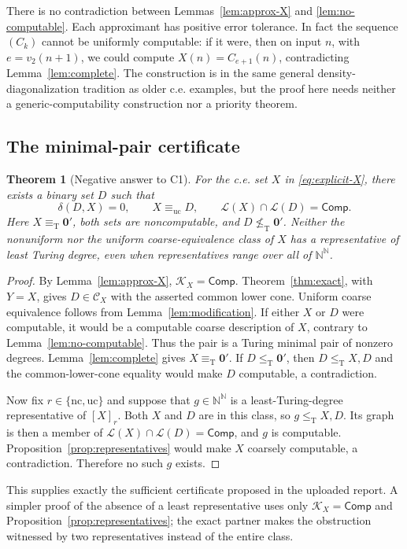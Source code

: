 \documentclass[11pt,a4paper]{article}
\newcommand{\N}{\mathbb N}
\newcommand{\Baire}{\N^{\N}}
\newcommand{\leT}{\leq_{\mathrm T}}
\newcommand{\nleT}{\nleq_{\mathrm T}}
\newcommand{\eqT}{\equiv_{\mathrm T}}
\newcommand{\nc}{\mathrm{nc}}
\newcommand{\uc}{\mathrm{uc}}
\newcommand{\CD}[1]{\mathcal C_{#1}}
\newcommand{\Core}[1]{\mathcal K_{#1}}
\newcommand{\Low}[1]{\mathcal L(#1)}
\newcommand{\Comp}{\mathsf{Comp}}
\newtheorem{theorem}{Theorem}[section]
\theoremstyle{definition}\newtheorem{definition}[theorem]{Definition}
\theoremstyle{remark}\newtheorem{remark}[theorem]{Remark}
\begin{document}
There is no contradiction between Lemmas~\ref{lem:approx-X} and \ref{lem:no-computable}. Each approximant has positive error tolerance. In fact the sequence $(C_k)$ cannot be uniformly computable: if it were, then on input $n$, with $e=v_2(n+1)$, we could compute $X(n)=C_{e+1}(n)$, contradicting Lemma~\ref{lem:complete}. The construction is in the same general density-diagonalization tradition as older c.e. examples, but the proof here needs neither a generic-computability construction nor a priority theorem.\cite{JS}

\subsection{The minimal-pair certificate}
\begin{theorem}[Negative answer to C1]\label{thm:C1}
For the c.e. set $X$ in \eqref{eq:explicit-X}, there exists a binary set $D$ such that
\[
 \delta(D,X)=0,\qquad X\equiv_{\uc}D,
 \qquad \Low X\cap\Low D=\Comp.
\]
Here $X\eqT\mathbf0'$, both sets are noncomputable, and $D\nleT\mathbf0'$. Neither the nonuniform nor the uniform coarse-equivalence class of $X$ has a representative of least Turing degree, even when representatives range over all of $\Baire$.
\end{theorem}
\begin{proof}
By Lemma~\ref{lem:approx-X}, $\Core X=\Comp$. Theorem~\ref{thm:exact}, with $Y=X$, gives $D\in\CD X$ with the asserted common lower cone. Uniform coarse equivalence follows from Lemma~\ref{lem:modification}. If either $X$ or $D$ were computable, it would be a computable coarse description of $X$, contrary to Lemma~\ref{lem:no-computable}. Thus the pair is a Turing minimal pair of nonzero degrees. Lemma~\ref{lem:complete} gives $X\eqT\mathbf0'$. If $D\leT\mathbf0'$, then $D\leT X,D$ and the common-lower-cone equality would make $D$ computable, a contradiction.

Now fix $r\in\{\nc,\uc\}$ and suppose that $g\in\Baire$ is a least-Turing-degree representative of $[X]_r$. Both $X$ and $D$ are in this class, so $g\leT X,D$. Its graph is then a member of $\Low X\cap\Low D=\Comp$, and $g$ is computable. Proposition~\ref{prop:representatives} would make $X$ coarsely computable, a contradiction. Therefore no such $g$ exists.
\end{proof}

This supplies exactly the sufficient certificate proposed in the uploaded report.\cite[Proposition ``A sufficient certificate for no least degree'']{Input} A simpler proof of the absence of a least representative uses only $\Core X=\Comp$ and Proposition~\ref{prop:representatives}; the exact partner makes the obstruction witnessed by two representatives instead of the entire class.
\end{document}
